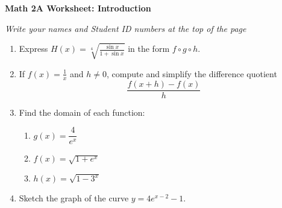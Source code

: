 \documentclass[12pt,fleqn]{article}
\begin{document}
\begin{center}
	\textbf{Math 2A Worksheet: Introduction}
\end{center}

\emph{Write your names and Student ID numbers at the top of the page}

\begin{enumerate}
  \item Express $\displaystyle H(x)=\sqrt[4]{\frac{\sin x}{1+\sin x}}$ in the form $f\circ g\circ h$.

	
	\vfill
	
	\item If $f(x)=\frac 1 x$ and $h\neq 0$, compute and simplify the difference quotient
	\[\frac{f(x+h)-f(x)}h\]
	
	\vfill\newpage
  
	
	\item Find the domain of each function:
	\begin{enumerate}
	  \item $g(x)=\dfrac 4{e^x}$
	  
	  \vspace{70pt}
	  
	  \item $f(x)=\sqrt{1+e^x}$
	  
	  \vspace{70pt}
	  
	  \item $h(x)=\sqrt{1-3^x}$
	  
	  \vspace{70pt}
	\end{enumerate}
	
	\item Sketch the graph of the curve $y=4e^{x-2}-1$.
	
	\vfill
\end{enumerate}
\end{document}
